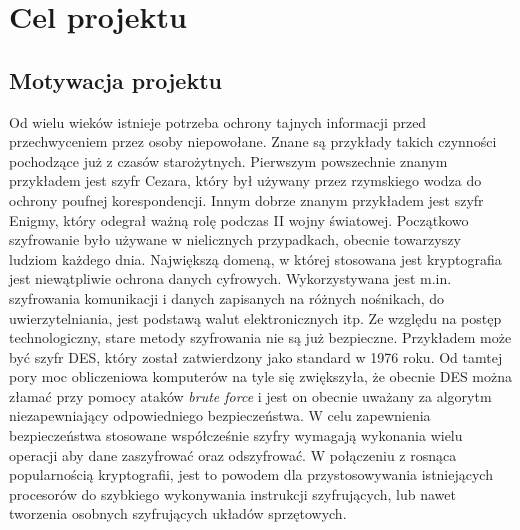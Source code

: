 \section{Cel projektu}
\label{sec:cel-projektu}

\subsection{Motywacja projektu}
Od wielu wieków istnieje potrzeba ochrony tajnych informacji przed przechwyceniem przez osoby niepowołane. Znane są przykłady takich czynności pochodzące już z czasów starożytnych. Pierwszym powszechnie znanym przykładem jest szyfr Cezara, który był używany przez rzymskiego wodza do ochrony poufnej korespondencji. Innym dobrze znanym przykładem jest szyfr Enigmy, który odegrał ważną rolę podczas II wojny światowej.
\newline
Początkowo szyfrowanie było używane w nielicznych przypadkach, obecnie towarzyszy ludziom każdego dnia. Największą domeną, w której stosowana jest kryptografia jest niewątpliwie ochrona danych cyfrowych. Wykorzystywana jest m.in. szyfrowania komunikacji i danych zapisanych na różnych nośnikach, do uwierzytelniania, jest podstawą walut elektronicznych itp.
\newline
Ze względu na postęp technologiczny, stare metody szyfrowania nie są już bezpieczne. Przykładem może być szyfr DES, który został zatwierdzony jako standard w 1976 roku. Od tamtej pory moc obliczeniowa komputerów na tyle się zwiększyła, że obecnie DES można złamać przy pomocy ataków \textit{brute force} i jest on obecnie uważany za algorytm niezapewniający odpowiedniego bezpieczeństwa.
\newline
W celu zapewnienia bezpieczeństwa stosowane współcześnie szyfry wymagają wykonania wielu operacji aby dane zaszyfrować oraz odszyfrować. W połączeniu z rosnąca popularnością kryptografii, jest to powodem dla przystosowywania istniejących procesorów do szybkiego wykonywania instrukcji szyfrujących, lub nawet tworzenia osobnych szyfrujących układów sprzętowych.

